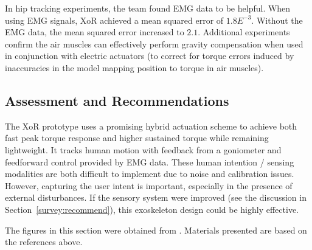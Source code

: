 \begin{refsection}
In hip tracking experiments, the team found EMG data to be helpful.  When using EMG signals, XoR achieved a mean squared error of $1.8E^{-3}$.  Without the EMG data, the mean squared error increased to $2.1$.  Additional experiments confirm the air muscles can effectively perform gravity compensation when used in conjunction with electric actuators (to correct for torque errors induced by inaccuracies in the model mapping position to torque in air muscles).


\subsection{Assessment and Recommendations}

The XoR prototype uses a promising hybrid actuation scheme to achieve both fast peak torque response and higher sustained torque while remaining lightweight.  It tracks human motion with feedback from a goniometer and feedforward control provided by EMG data.  These human intention / sensing modalities are both difficult to implement due to noise and calibration issues.  However, capturing the user intent is important, especially in the presence of external disturbances.  If the sensory system were improved (see the discussion in Section~\ref{survey:recommend}), this exoskeleton design could be highly effective. 

\nocite{*}
\printbibliography[heading=subbibliography]

The figures in this section were obtained from \cite{xorDesign2011,XoRkinemExtraction2012}. Materials presented are based on the references above.

\end{refsection}
